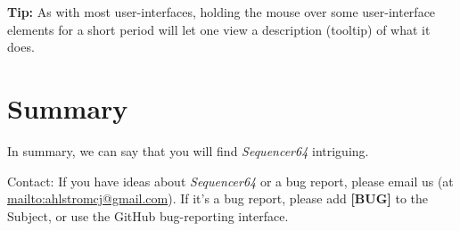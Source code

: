 \documentclass[
 11pt,
 twoside,
 a4paper,
 headinclude,
 footinclude,
 final                                 %
]{article}
\begin{document}

   \textbf{Tip:}
   As with most user-interfaces, holding the mouse over some user-interface
   elements for a short period will let one view a description (tooltip)
   of what it does.


\rhead{\rightmark}         %











































%
% 

\section{Summary}
\label{sec:summary}

   In summary, we can say that you will find \textsl{Sequencer64} intriguing.

   Contact: If you have ideas about \textsl{Sequencer64} or a bug report, please
   email us (at \url{mailto:ahlstromcj@gmail.com}).
   If it's a bug report, please add \textbf{[BUG]} to the Subject, or use the
   GitHub bug-reporting interface.




\printindex
\end{document}
